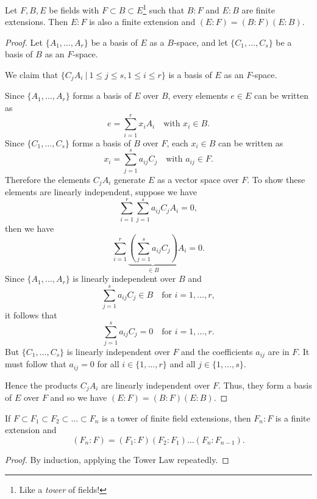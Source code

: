 \begin{theorem}
	Let $F, B, E$ be fields with $F \subset B \subset E$\footnote{Like a \emph{tower} of fields!} such that $B:F$ and $E:B$ are finite extensions. Then $E:F$ is also a finite extension and $(E:F) = (B:F)(E:B)$.
	\begin{proof}
		Let $\{A_1, \dots, A_r\}$ be a basis of $E$ as a $B$-space, and let $\{C_1, \dots, C_s\}$ be a basis of $B$ as an $F$-space.
		
		We claim that $\{C_j A_i\ |\ 1 \leq j \leq s, 1 \leq i \leq r\}$ is a basis of $E$ as an $F$-space.
		
		Since $\{A_1, \dots, A_r\}$ forms a basis of $E$ over $B$, every elements $e \in E$ can be written as
		\[
			e = \sum_{i = 1}^r{x_i A_i} \quad \text{with } x_i \in B.
		\]
		Since $\{C_1, \dots, C_s\}$ forms a basis of $B$ over $F$, each $x_i \in B$ can be written as
		\[
			x_i = \sum_{j = 1}^s{a_{ij} C_j} \quad \text{with } a_{ij} \in F.
		\]
		Therefore the elements $C_j A_i$ generate $E$ as a vector space over $F$. To show these elements are linearly independent, suppose we have
		\[
			\sum_{i = 1}^r{\sum_{j = 1}^s{a_{ij} C_j A_i}} = 0,
		\]
		then we have
		\[
			\sum_{i = 1}^r{\underbrace{\left(\sum_{j = 1}^s{a_{ij} C_j}\right)}_{\in B} A_i} = 0.
		\]
		Since $\{A_1, \dots, A_r\}$ is linearly independent over $B$ and
		\[
			\sum_{j = 1}^s{a_{ij} C_j} \in B \quad \text{for } i = 1, \dots, r,
		\]
		it follows that
		\[
			\sum_{j = 1}^s{a_{ij} C_j} = 0 \quad \text{for } i = 1, \dots, r.
		\]
		But $\{C_1, \dots, C_s\}$ is linearly independent over $F$ and the coefficients $a_{ij}$ are in $F$. It must follow that $a_{ij} = 0$ for all $i \in \{1, \dots, r\}$ and all $j \in \{1, \dots, s\}$.
		
		Hence the products $C_j A_i$ are linearly independent over $F$. Thus, they form a basis of $E$ over $F$ and so we have $(E : F) = (B : F)(E : B)$.
	\end{proof}
\end{theorem}

\begin{corollary}
	If $F \subset F_1 \subset F_2 \subset \dots \subset F_n$ is a tower of finite field extensions, then $F_n : F$ is a finite extension and
	\[
		(F_n : F) = (F_1 : F)(F_2 : F_1)\dots(F_n : F_{n - 1}).
	\]
	\begin{proof}
		By induction, applying the Tower Law repeatedly.
	\end{proof}
\end{corollary}

